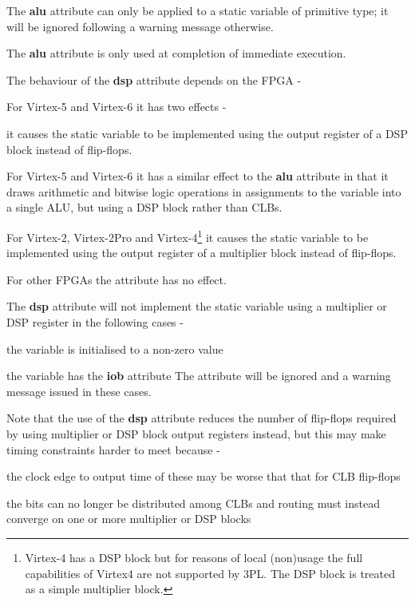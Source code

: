         The {\bf alu} attribute can only be applied to a static variable of
        primitive type; it will be ignored following a warning message
        otherwise.

        The {\bf alu} attribute is only used at completion of immediate execution.
        
        The behaviour of the {\bf dsp} attribute depends on the FPGA -
        \blist
        \item   For Virtex-5 and Virtex-6 it has two effects -
                \blist
                \item   it causes the static variable to be implemented using
                        the output register of a DSP block instead of
                        flip-flops.
                \item   For Virtex-5 and Virtex-6 it has a similar effect to
                        the {\bf alu} attribute in that it draws arithmetic and
                        bitwise logic operations in assignments to the
                        variable into a single ALU, but using a DSP block
                        rather than CLBs.
                \blend
        \item   For Virtex-2, Virtex-2Pro and Virtex-4\footnote{Virtex-4 has a
                DSP block but for reasons of local (non)usage the full
                capabilities of Virtex4 are not supported by 3PL. The DSP
                block is treated as a simple multiplier block.} it causes the
                static variable to be implemented using the output register
                of a multiplier block instead of flip-flops.
        \item   For other FPGAs the attribute has no effect.
        \blend
        
        The {\bf dsp} attribute will not implement the static variable using
        a multiplier or DSP register in the following cases -
        \blist
        \item   the variable is initialised to a non-zero value
        \item   the variable has the {\bf iob} attribute
        \blend
        The attribute will be ignored and a warning message issued in these
        cases.
        
        Note that the use of the {\bf dsp} attribute reduces the number of
        flip-flops required by using multiplier or DSP block output registers
        instead, but this may make timing constraints harder to meet because -
        \blist
        \item   the clock edge to output time of these may be worse that that
                for CLB flip-flops
        \item   the bits can no longer be distributed among CLBs and routing
                must instead converge on one or more multiplier or DSP blocks
        \blend
   
